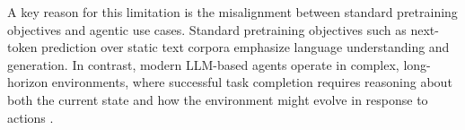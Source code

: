\documentclass{article}
\theoremstyle{plain}
\theoremstyle{definition}
\theoremstyle{remark}
\begin{document}

A key reason for this limitation is the misalignment between standard pretraining objectives and agentic use cases. 
Standard pretraining objectives such as next-token prediction over static text corpora emphasize language understanding and generation.
In contrast, modern LLM-based agents operate in complex, long-horizon environments, where successful task completion requires reasoning about both the current state and how the environment might evolve in response to actions \citep{LeCun2022APT,hu2023languagemodelsagentmodels,hao2023reasoninglanguagemodelplanning}.
\end{document}
